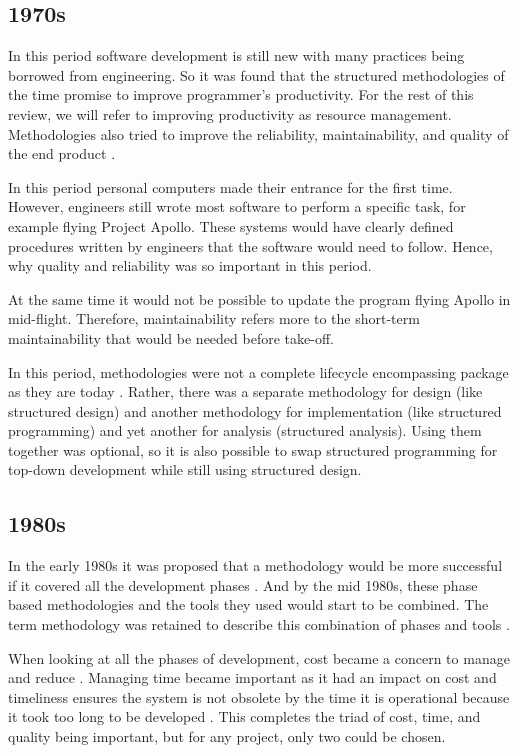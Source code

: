 \subsection{1970s}
In this period software development is still new with many practices being borrowed from engineering.
So it was found that the structured methodologies of the time promise to improve programmer's productivity.
For the rest of this review, we will refer to improving productivity as resource management.
Methodologies also tried to improve the reliability, maintainability, and quality of the end product \cite{yourdon_1977}.

In this period personal computers made their entrance for the first time.
However, engineers still wrote most software to perform a specific task, for example flying Project Apollo.
These systems would have clearly defined procedures written by engineers that the software would need to follow.
Hence, why quality and reliability was so important in this period.

At the same time it would not be possible to update the program flying Apollo in mid-flight. 
Therefore, maintainability refers more to the short-term maintainability that would be needed before take-off.

In this period, methodologies were not a complete lifecycle encompassing package as they are today \cite{soi_1982, beregi_1985}.
Rather, there was a separate methodology for design (like structured design) and another methodology for implementation (like structured programming) and yet another for analysis (structured analysis).
Using them together was optional, so it is also possible to swap structured programming for top-down development while still using structured design. \cite{yourdon_1977}

\subsection{1980s}
In the early 1980s it was proposed that a methodology would be more successful if it covered all the development phases \cite{soi_1982}.
And by the mid 1980s, these phase based methodologies and the tools they used would start to be combined.
The term methodology was retained to describe this combination of phases and tools \cite{beregi_1985}. 

When looking at all the phases of development, cost became a concern to manage and reduce \cite{vanderlei_1983, peacham_1985, loesh_1985}.
Managing time became important as it had an impact on cost and timeliness ensures the system is not obsolete by the time it is operational because it took too long to be developed \cite{peacham_1985, beregi_1985, mannino_1987, paul_1993}. 
This completes the triad of cost, time, and quality being important, but for any project, only two could be chosen.

